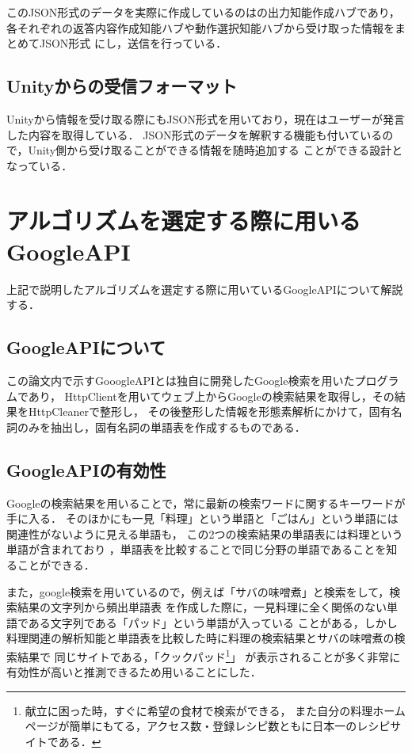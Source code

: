 このJSON形式のデータを実際に作成しているのはの出力知能作成ハブであり，
各それぞれの返答内容作成知能ハブや動作選択知能ハブから受け取った情報をまとめてJSON形式
にし，送信を行っている．


\subsection{Unityからの受信フォーマット}
Unityから情報を受け取る際にもJSON形式を用いており，現在はユーザーが発言した内容を取得している．
JSON形式のデータを解釈する機能も付いているので，Unity側から受け取ることができる情報を随時追加する
ことができる設計となっている．


\newpage

\section{アルゴリズムを選定する際に用いるGoogleAPI}
上記で説明したアルゴリズムを選定する際に用いているGoogleAPIについて解説する．

\subsection{GoogleAPIについて}
この論文内で示すGooogleAPIとは独自に開発したGoogle検索を用いたプログラムであり，
HttpClientを用いてウェブ上からGoogleの検索結果を取得し，その結果をHttpCleanerで整形し，
その後整形した情報を形態素解析にかけて，固有名詞のみを抽出し，固有名詞の単語表を作成するものである．

\subsection{GoogleAPIの有効性}
Googleの検索結果を用いることで，常に最新の検索ワードに関するキーワードが手に入る．
そのほかにも一見「料理」という単語と「ごはん」という単語には関連性がないように見える単語も，
この2つの検索結果の単語表には料理という単語が含まれており
，単語表を比較することで同じ分野の単語であることを知ることができる．

また，google検索を用いているので，例えば「サバの味噌煮」と検索をして，検索結果の文字列から頻出単語表
を作成した際に，一見料理に全く関係のない単語である文字列である「パッド」という単語が入っている
ことがある，しかし料理関連の解析知能と単語表を比較した時に料理の検索結果とサバの味噌煮の検索結果で
同じサイトである，「クックパッド\footnote{献立に困った時，すぐに希望の食材で検索ができる，
また自分の料理ホームページが簡単にもてる，アクセス数・登録レシピ数ともに日本一のレシピサイトである．}」
が表示されることが多く非常に有効性が高いと推測できるため用いることにした．
